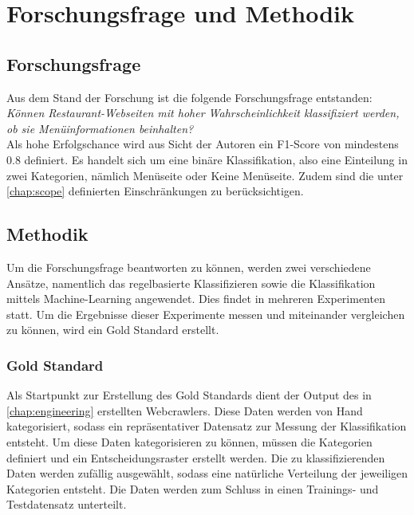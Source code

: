 \chapter{Forschungsfrage und Methodik}
\section{Forschungsfrage}
Aus dem Stand der Forschung ist die folgende Forschungsfrage entstanden:\\

\emph{Können Restaurant-Webseiten mit hoher Wahrscheinlichkeit klassifiziert werden, ob sie Menüinformationen beinhalten?}\\

Als hohe Erfolgschance wird aus Sicht der Autoren ein F1-Score von mindestens 0.8 definiert.
Es handelt sich um eine binäre Klassifikation, also eine Einteilung in zwei Kategorien, nämlich \glqq Menüseite\grqq{} oder \glqq Keine Menüseite\grqq.
Zudem sind die unter \cref{chap:scope} definierten Einschränkungen zu berücksichtigen.
\section{Methodik}
Um die Forschungsfrage beantworten zu können, werden zwei verschiedene Ansätze, namentlich das regelbasierte Klassifizieren sowie die Klassifikation mittels Machine-Learning angewendet.
Dies findet in mehreren Experimenten statt.
Um die Ergebnisse dieser Experimente messen und miteinander vergleichen zu können, wird ein Gold Standard erstellt.
\subsection{Gold Standard}
Als Startpunkt zur Erstellung des Gold Standards dient der Output des in \cref{chap:engineering} erstellten Webcrawlers.
Diese Daten werden von Hand kategorisiert, sodass ein repräsentativer Datensatz zur Messung der Klassifikation entsteht.
Um diese Daten kategorisieren zu können, müssen die Kategorien definiert und ein Entscheidungsraster erstellt werden.
Die zu klassifizierenden Daten werden zufällig ausgewählt, sodass eine natürliche Verteilung der jeweiligen Kategorien entsteht.
Die Daten werden zum Schluss in einen Trainings- und Testdatensatz unterteilt.
